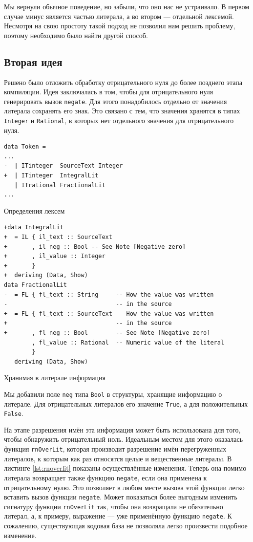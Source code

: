 Мы вернули обычное поведение, но забыли, что оно нас не устраивало. В первом
случае минус является частью литерала, а во втором --- отдельной лексемой.
Несмотря на свою простоту такой подход не позволил нам решить проблему, поэтому
необходимо было найти другой способ.

\subsection{Вторая идея}

Решено было отложить обработку отрицательного нуля до более позднего этапа
компиляции. Идея заключалась в том, чтобы для отрицательного нуля генерировать
вызов \texttt{negate}. Для этого понадобилось отдельно от значения литерала
сохранять его знак. Это связано с тем, что значения хранятся в типах
\texttt{Integer} и \texttt{Rational}, в которых нет отдельного значения для
отрицательного нуля.

\begin{ListingEnv}[H]
\begin{lstlisting}
data Token =
...
-  | ITinteger  SourceText Integer
+  | ITinteger  IntegralLit
   | ITrational FractionalLit
...
\end{lstlisting}
\caption{Определения лексем}
\end{ListingEnv}

\begin{ListingEnv}[H]
\begin{lstlisting}
+data IntegralLit
+  = IL { il_text :: SourceText
+       , il_neg :: Bool -- See Note [Negative zero]
+       , il_value :: Integer
+       }
+  deriving (Data, Show)
data FractionalLit
-  = FL { fl_text :: String     -- How the value was written
-                               -- in the source
+  = FL { fl_text :: SourceText -- How the value was written
+                               -- in the source
+       , fl_neg :: Bool        -- See Note [Negative zero]
        , fl_value :: Rational  -- Numeric value of the literal
        }
   deriving (Data, Show)
\end{lstlisting}
\caption{Хранимая в литерале информация}
\end{ListingEnv}

Мы добавили поле \texttt{neg} типа \texttt{Bool} в структуры, хранящие
информацию о литерале. Для отрицательных литералов его значение \texttt{True},
а для положительных \texttt{False}.

На этапе разрешения имён эта информация может быть использована для того, чтобы
обнаружить отрицательный ноль. Идеальным местом для этого оказалась функция
\texttt{rnOverLit}, которая производит разрешение имён перегруженных литералов,
к которым как раз относятся целые и вещественные литералы. В листинге
\ref{lst:rnoverlit} показаны осуществлённые изменения.  Теперь она помимо
литерала возвращает также функцию \texttt{negate}, если она применена к
отрицательному нулю. Это позволяет в любом месте вызова этой функции легко
вставить вызов функции \texttt{negate}.  Может показаться более выгодным
изменить сигнатуру функции \texttt{rnOverLit} так, чтобы она возвращала не
обязательно литерал, а, к примеру, выражение --- уже применённую функцию
\texttt{negate}. К сожалению, существующая кодовая база не позволяла легко
произвести подобное изменение.

